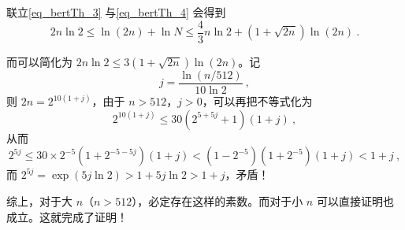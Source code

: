 联立\autoref{eq_bertTh_3} 与\autoref{eq_bertTh_4} 会得到
\begin{equation}
2n \ln 2 \le \ln(2n) + \ln N \le \frac43 n \ln 2 + (1+\sqrt{2n}) \ln(2n) ~.
\end{equation}

而可以简化为 $2n\ln2\le3(1+\sqrt{2n})\ln(2n)$。记
\begin{equation}
j = \frac{\ln(n/512)}{10 \ln 2} ~,
\end{equation}
则 $2n = 2^{10(1+j)}$，由于 $n  > 512$，$j > 0$，可以再把不等式化为
\begin{equation}
2^{10 (1+j)} \le 30(2^{5+5j} + 1)(1+j) ~,
\end{equation}
从而
\begin{equation}
2^{5j} \le 30 \times 2^{-5} (1 + 2^{-5 - 5j})(1+j) < (1-2^{-5})(1+2^{-5})(1+j) < 1+j ~,
\end{equation}
而 $2^{5j} = \exp(5j\ln2)>1+5j\ln2>1+j$，矛盾！

综上，对于大 $n$（$n > 512$），必定存在这样的素数。而对于小 $n$ 可以直接证明也成立。这就完成了证明！